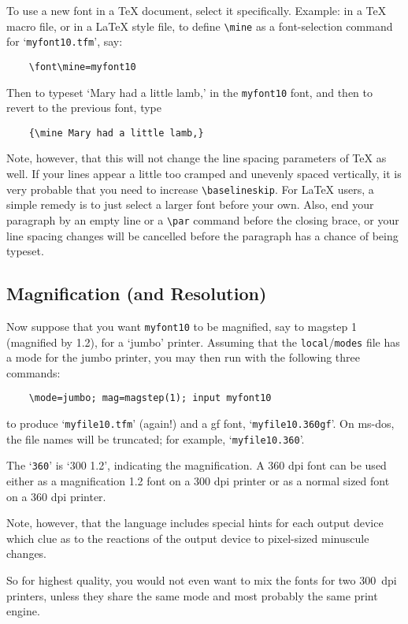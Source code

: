 To use a new font in a \TeX{} document, select it specifically.
Example:  in a \TeX{} macro file, or in a \LaTeX{} style file,
to define \verb+\mine+ as a font-selection command for
`{\tt myfont10.tfm}', say:
\begin{verbatim}
    \font\mine=myfont10
\end{verbatim}

Then to typeset `Mary had a little lamb,' in the {\tt myfont10} font,
and then to revert to the previous font, type
\begin{verbatim}
    {\mine Mary had a little lamb,}
\end{verbatim}
Note, however, that this will not change the line spacing parameters
of \TeX{} as
well. If your lines appear a little too cramped and unevenly spaced vertically,
it is very probable that you need to increase \verb+\baselineskip+.
For \LaTeX{} users, a simple remedy is to just select a larger font
before your own.  Also, end your paragraph by an empty line or a
\verb+\par+ command before the closing brace, or your line spacing changes
will be cancelled before the paragraph has a chance of being typeset.


\subsection{Magnification (and Resolution)}\label{sub:mag}

Now suppose that you want {\tt myfont10} to be magnified,
say to magstep 1 (magnified by 1.2), for a `jumbo' printer.
Assuming that the {\tt local}/{\tt modes} file has a mode
for the jumbo printer,
you may then run \MF{} with the following three commands:
\begin{verbatim}
    \mode=jumbo; mag=magstep(1); input myfont10
\end{verbatim}
to produce `{\tt myfile10.tfm}' (again!)
and a {\sc gf} font, `{\tt myfile10.360gf}'.
On {\sc ms-dos}, the file names will be truncated;
for example, `{\tt myfile10.360}'.

The `{\tt 360}' is `300 {\tt *} 1.2', indicating the magnification.
A 360 dpi font can be used either as a magnification 1.2 font on
a 300 dpi printer or as a normal sized font on a 360 dpi printer.

Note, however, that the \MF{} language includes special hints for
each output device which clue \MF{} as to the reactions of the
output device to pixel-sized minuscule changes.

So for highest quality, you would not even want to mix the fonts for
two 300~dpi printers, unless they share the same mode and most probably
the same print engine.



